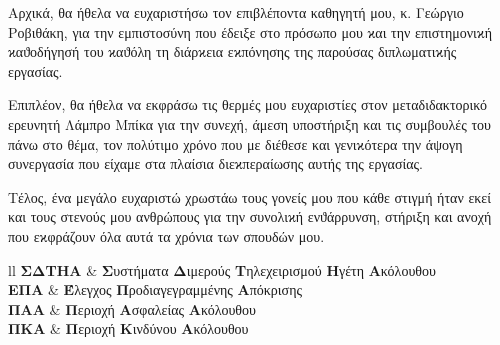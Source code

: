 \documentclass[
12pt, %
twoside, %
openright,
english,
headsepline, %
]{MastersDoctoralThesis} %
\theoremstyle{underline}
\begin{document}
	
	\begin{acknowledgements}
	Αρχικά, θα ήθελα να ευχαριστήσω τον επιβλέποντα καθηγητή μου, κ. Γεώργιο Ροβιθάκη, για την εμπιστοσύνη που έδειξε στο πρόσωπο μου ϰαι την επιστημονιϰή ϰαϑοδήγησή του ϰαϑόλη τη διάρϰεια εϰπόνησης της παρούσας διπλωματιϰής εργασίας.

	\bigskip
	Επιπλέον, θα ήθελα να εκφράσω τις θερμές μου ευχαριστίες στον μεταδιδακτορικό ερευνητή Λάμπρο Μπίκα για την συνεχή, άμεση υποστήριξη και τις συμβουλές του πάνω στο θέμα, τον πολύτιμο χρόνο που με διέθεσε και γενιϰότερα την άψογη συνεργασία που είχαμε στα πλαίσια διεϰπεραίωσης αυτής της εργασίας.

	\bigskip
	Τέλος, ένα μεγάλο ευχαριστώ χρωστάω τους γονείς μου που κάθε στιγμή ήταν εκεί και τους στενούς μου ανθρώπους για την συνολιϰή ενϑάρρυνση, στήριξη και ανοχή που εϰφράζουν όλα αυτά τα χρόνια των σπουδών μου.
	
	\end{acknowledgements}

	\let\cleardoublepage\clearpage
	
	
	\renewcommand{\contentsname}{Πίνακας Περιεχομένων}
	\tableofcontents %
	\let\cleardoublepage\clearpage
	
	\renewcommand{\listfigurename}{Λίστα Σχημάτων}
	\listoffigures %
	\renewcommand{\figurename}{Σχήμα}
	\let\cleardoublepage\clearpage
	
	
	\begin{abbreviations}{ll} %
	\textbf{ΣΔΤΗΑ} & \textbf{Σ}υστήματα \textbf{Δ}ιμερούς \textbf{Τ}ηλεχειρισμού \textbf{Η}γέτη \textbf{Α}κόλουθου\\
	\textbf{ΕΠΑ} & \textbf{Έ}λεγχος \textbf{Π}ροδιαγεγραμμένης \textbf{Α}πόκρισης\\
	\textbf{ΠΑΑ} & \textbf{Π}εριοχή \textbf{Α}σφαλείας \textbf{Α}κόλουθου\\
	\textbf{ΠΚΑ} & \textbf{Π}εριοχή \textbf{Κ}ινδύνου \textbf{Α}κόλουθου\\
	\end{abbreviations}
\end{document}

